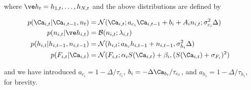 \noindent where $\h_t=h_{1,t}, \ldots, h_{N,t}$ and the above distributions are defined by

\begin{align}
p(\Ca_{i,t} | \Ca_{i,t-1}, n_t) &= \mathcal{N}(\Ca_{i,t}; a_{c_i} \Ca_{i,t-1} + b_i + A_i n_{i,t}; \sigma_{c_i}^2 \Delta) \\
p(n_{i,t} | \h_{i,t}) &= \mathcal{B}(n_{i,t}; \lambda_{i,t}) \\
p(h_{i,t} | h_{i,t-1}, n_{i,t-1}) &= \mathcal{N}(h_{i,t}; a_{h_i} h_{i,t-1} + n_{i,t-1}, \sigma_{h_i}^2 \Delta)\\
p(F_{i,t} | \Ca_{i,t}) &= \mathcal{N}(F_{i,t}; \alpha_i S(\Ca_{i,t}) + \beta_i, (S(\Ca_{i,t}) + \sigma_{F_i})^2)
\end{align}

\noindent and we have introduced $a_{c_i}=1-\Delta/\tau_{c_i}$, $b_i=-\Delta \Ca_{b_i} / \tau_{c_i}$, and $a_{h_i}=1- \Delta / \tau_{h_i}$, for brevity.
